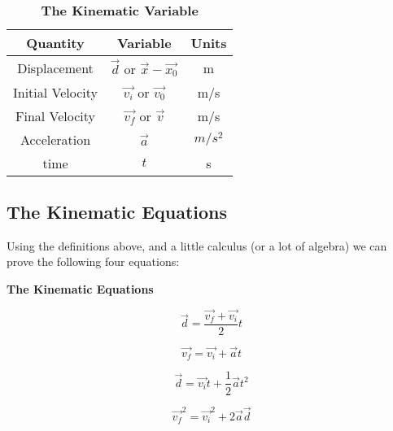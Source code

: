 \begin{center}
	
	
	\begin{table}[ht]\caption{\textbf{The Kinematic Variable}}%
		\centering %
		\begin{tabular}{|c|c|c|}
			\hline \hline
			\textbf{Quantity} & \textbf{Variable} & \textbf{Units} \\
			\hline
			Displacement & $\vec{d}$ or $\vec{x}-\vec{x_0}$  & m \\
			\hline
			
			Initial Velocity & $\vec{v_i}$ or $\vec{v_0}$  & m/s \\
			\hline
			
			Final Velocity & $\vec{v_f}$ or $\vec{v}$  & m/s \\
			\hline
			
			Acceleration & $\vec{a}$   & $m/s^2$ \\
			\hline
			
			time & $t $  & s \\
			\hline
		\end{tabular}
		\label{table:kinematic1d}%
	\end{table}
\end{center}

\subsection{The Kinematic Equations}

 \label{kinematicequations}
Using the definitions above, and a little calculus (or a lot of algebra) we can prove the following four equations:
\begin{mdframed}[backgroundcolor=orange!20!white]
	\begin{center}
		\textbf{The Kinematic Equations}
	\end{center}
	\begin{multicols}{2}
		\begin{equation}
		\vec{d} = \frac{\overrightarrow{v_f} + \overrightarrow{v_i}}{2}  t
		\label{equation:kinematic1}
		\end{equation}
			
		\begin{equation}
		\overrightarrow{v_f} = \overrightarrow{v_i} + \vec{a} t
		\label{equation:kinematic2}
		\end{equation}	
			
		\begin{equation}
		\vec{d} = \overrightarrow{v_i} t + \frac{1}{2}\vec{a}{t}^2
		\label{equation:kinematic3}
		\end{equation}
		
		\begin{equation}
		\overrightarrow{v_f}^2 = \overrightarrow{v_i}^2 + 2\vec{a}\vec{d}
		\label{equation:kinematic4}
		\end{equation}
		
		
			
		\end{multicols}
	\end{mdframed}

